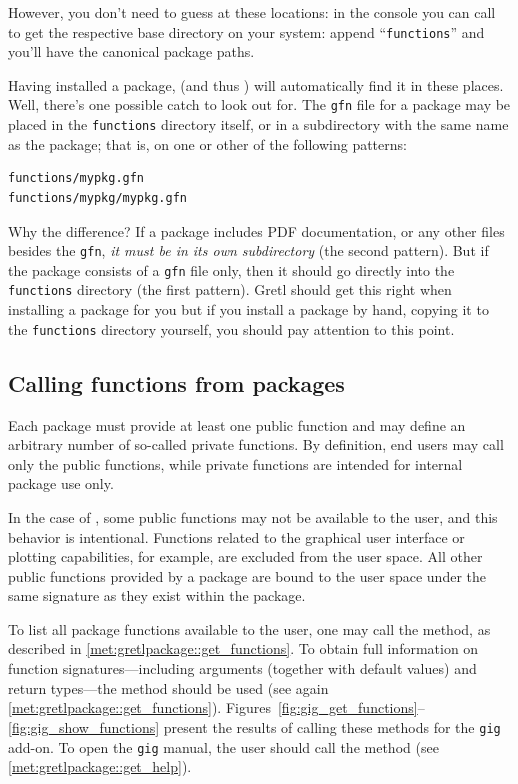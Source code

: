 However, you don't need to guess at these locations: in the \python
console you can call 
to get the respective base directory on your system: append
``\texttt{functions}'' and you'll have the canonical package paths.

Having installed a package, \gretlpy (and thus \lgretl) will automatically
find it in these places. Well, there's one possible catch to look out for.
The \texttt{gfn} file for a package may be placed in the \texttt{functions}
directory itself, or in a subdirectory with the same name as the package;
that is, on one or other of the following patterns:
\begin{verbatim}
functions/mypkg.gfn
functions/mypkg/mypkg.gfn
\end{verbatim}
Why the difference? If a package includes PDF documentation, or any
other files besides the \texttt{gfn}, \textit{it must be in its own
	subdirectory} (the second pattern). But if the package consists of
a \texttt{gfn} file only, then it should go directly into the \texttt{functions}
directory (the first pattern). Gretl should get this right when
installing a package for you but if you install a package by hand,
copying it to the \texttt{functions} directory yourself, you should
pay attention to this point.


\subsection{Calling functions from packages}
Each \gretl package must provide at least one public function and may define
an arbitrary number of so-called private functions. By definition, end users
may call only the public functions, while private functions are intended
for internal package use only. 

In the case of \gretlpy, some public functions may not be available to the
user, and this behavior is intentional. Functions related to the graphical
user interface or plotting capabilities, for example, are excluded from the
\gretlpy user space. All other public functions provided by a package are
bound to the user space under the same signature as they exist within the
package.

To list all package functions available to the user, one may call the
 method, as described in
\ref{met:gretlpackage::get_functions}. To obtain full information on function
signatures—including arguments (together with default values) and return
types—the  method should be used (see again
\ref{met:gretlpackage::get_functions}).
Figures~\ref{fig:gig_get_functions}–\ref{fig:gig_show_functions} present the
results of calling these methods for the \texttt{gig} add-on. To open the
\texttt{gig} manual, the user should call the  method
(see \ref{met:gretlpackage::get_help}).

